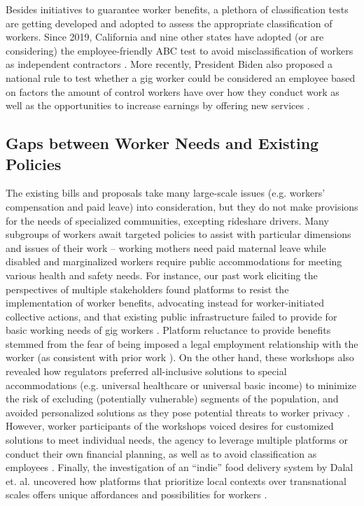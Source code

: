 Besides initiatives to guarantee worker benefits, a plethora of classification tests are getting developed and adopted to assess the appropriate classification of workers. Since 2019, California and nine other states have adopted (or are considering) the employee-friendly ABC test to avoid misclassification of workers as independent contractors \cite{Iacurci2022-po}. More recently, President Biden also proposed a national rule to test whether a gig worker could be considered an employee based on factors the amount of control workers have over how they conduct work as well as the opportunities to increase earnings by offering new services \cite{Scheiber2022-oo}. 

\subsection{Gaps between Worker Needs and Existing Policies}
The existing bills and proposals take many large-scale issues (e.g. workers' compensation and paid leave) into consideration, but they do not make provisions for the needs of specialized communities, excepting rideshare drivers. Many subgroups of workers await targeted policies to assist with particular dimensions and issues of their work – working mothers need paid maternal leave while disabled and marginalized workers require public accommodations for meeting various health and safety needs. For instance, our past work eliciting the perspectives of multiple stakeholders found platforms to resist the implementation of worker benefits, advocating instead for worker-initiated collective actions, and that existing public infrastructure failed to provide for basic working needs of gig workers \cite{codesign}. Platform reluctance to provide benefits stemmed from the fear of being imposed a legal employment relationship with the worker (as consistent with prior work \cite{harris2015proposal}). On the other hand, these workshops also revealed how regulators preferred all-inclusive solutions to special accommodations (e.g. universal healthcare or universal basic income) to minimize the risk of excluding (potentially vulnerable) segments of the population, and avoided personalized solutions as they pose potential threats to worker privacy \cite{codesign}. However, worker participants of the workshops voiced desires for customized solutions to meet individual needs, the agency to leverage multiple platforms or conduct their own financial planning, as well as to avoid classification as employees \cite{codesign}. Finally, the investigation of an ``indie'' food delivery system by Dalal et. al. uncovered how platforms that prioritize local contexts over transnational scales offers unique affordances and possibilities for workers \cite{dalal2023understanding}.

